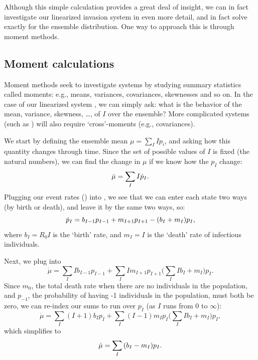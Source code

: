 \documentclass{amsproc}
\theoremstyle{definition}
\theoremstyle{remark}
\numberwithin{equation}{section}
\begin{document}
Although this simple calculation provides a great deal of insight, we can in fact investigate our linearized invasion system  in even more detail, and in fact solve exactly for the ensemble distribution.  One way to approach this is through moment methods.

\subsection{Moment calculations}

Moment methods seek to investigate systems by studying summary statistics called moments: e.g., means, variances, covariances, skewnesses and so on.  In the case of our linearized system , we can simply ask: what is the behavior of the mean, variance, skewness, \ldots, of $I$ over the ensemble?  More complicated systems (such as ) will also require `cross'-moments (e.g., covariances).

We start by defining the ensemble mean $\mu = \sum_I {I p_i}$, and asking how this quantity changes through time.  Since the set of possible values of $I$ is fixed (the natural numbers), we can find the change in $\mu$ if we know how the $p_I$ change:
\begin{equation}
	\dot \mu = \sum_I {I \dot p_I}. 
	\eqlab{mudot.Idot}
\end{equation}
Plugging our event rates () into , we see that we can enter each state two ways (by birth or death), and leave it by the same two ways, so:
\begin{equation}
	\dot p_I = b_{I-1}p_{I-1} + m_{I+1}p_{I+1} - (b_{I}+m_{I})p_I,
	\eqlab{pI}
\end{equation}
where $b_{I} = R_0I$ is the `birth' rate, and $m_{I} = I$ is the `death' rate of infectious individuals.

Next, we plug  into 
\begin{equation}
	\dot \mu =
		\sum_I {I b_{I-1}p_{I-1}}
		+ \sum_I {I m_{I+1}p_{I+1}}
		(\sum_I {Ib_{I}+m_{I})p_I}.
\end{equation}
Since $m_0$, the total death rate when there are no individuals in the population, and $p_{-1}$, the probability of having -1 individuals in the population, must both be zero, we can re-index our sums to run over $p_I$ (as $I$ runs from 0 to $\infty$):
\begin{equation}
	\dot \mu =
		\sum_I {(I+1) b_{I}p_{I}}
		+ \sum_I {(I-1) m_{I}p_{I}}
		(\sum_I {Ib_{I}+m_{I})p_I},
\end{equation}
which simplifies to
\begin{equation}
	\dot \mu = \sum_I{(b_I-m_I) p_I}.
	\eqlab{mudot.r}
\end{equation}
\end{document}
